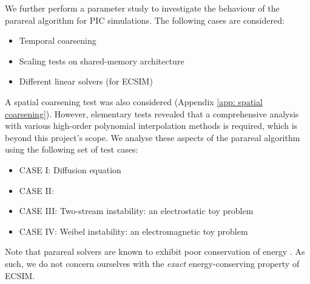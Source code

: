  We further perform a parameter study to investigate the behaviour of the parareal algorithm for PIC simulations. The following cases are considered: 
 \begin{itemize}
 
    \item Temporal coarsening
    
    \item Scaling tests on shared-memory architecture
    
    \item Different linear solvers (for ECSIM)
 
 \end{itemize}
A spatial coarsening test was also considered (Appendix \ref{app: spatial coarsening}). However, elementary tests revealed that a comprehensive analysis with various high-order polynomial interpolation methods is required, which is beyond this project's scope. 
We analyse these aspects of the parareal algorithm using the following set of test cases:

\begin{itemize}

    \item CASE I: Diffusion equation

    \item CASE II: 

    \item CASE III: Two-stream instability: an electrostatic toy problem

    \item CASE IV: Weibel instability: an electromagnetic toy problem
    
\end{itemize}
Note that parareal solvers are known to exhibit poor conservation of energy \cite{}. As such, we do not concern ourselves with the \textit{exact} energy-conserving property of ECSIM.



